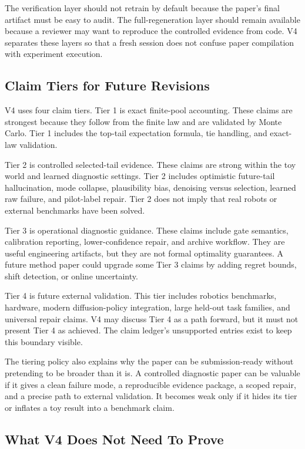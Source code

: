 \documentclass{article}
\begin{document}
The verification layer should not retrain by default because the paper's final
artifact must be easy to audit. The full-regeneration layer should remain
available because a reviewer may want to reproduce the controlled evidence
from code. V4 separates these layers so that a fresh session does not confuse
paper compilation with experiment execution.

\subsection{Claim Tiers for Future Revisions}
\label{app:v4-claim-tiers}

V4 uses four claim tiers. Tier 1 is exact finite-pool accounting. These claims
are strongest because they follow from the finite law and are validated by
Monte Carlo. Tier 1 includes the top-tail expectation formula, tie handling,
and exact-law validation.

Tier 2 is controlled selected-tail evidence. These claims are strong within
the toy world and learned diagnostic settings. Tier 2 includes optimistic
future-tail hallucination, mode collapse, plausibility bias, denoising versus
selection, learned raw failure, and pilot-label repair. Tier 2 does not imply
that real robots or external benchmarks have been solved.

Tier 3 is operational diagnostic guidance. These claims include gate
semantics, calibration reporting, lower-confidence repair, and archive
workflow. They are useful engineering artifacts, but they are not formal
optimality guarantees. A future method paper could upgrade some Tier 3 claims
by adding regret bounds, shift detection, or online uncertainty.

Tier 4 is future external validation. This tier includes robotics benchmarks,
hardware, modern diffusion-policy integration, large held-out task families,
and universal repair claims. V4 may discuss Tier 4 as a path forward, but it
must not present Tier 4 as achieved. The claim ledger's unsupported entries
exist to keep this boundary visible.

The tiering policy also explains why the paper can be submission-ready without
pretending to be broader than it is. A controlled diagnostic paper can be
valuable if it gives a clean failure mode, a reproducible evidence package, a
scoped repair, and a precise path to external validation. It becomes weak only
if it hides its tier or inflates a toy result into a benchmark claim.

\subsection{What V4 Does Not Need To Prove}
\label{app:v4-not-needed}
\end{document}
